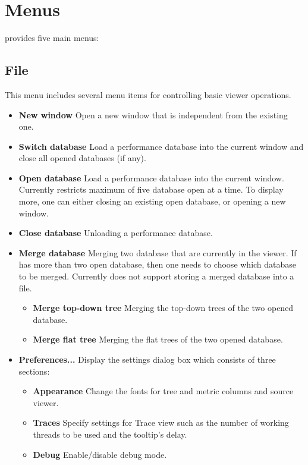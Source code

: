 \documentclass[english]{article}
\begin{document}
\section{Menus}

 provides five main menus:


\subsection{File}
This menu includes several menu items for controlling basic viewer operations.
\begin{itemize}
\item \textbf{New window}
  Open a new  window that is independent from the existing one.

\item \textbf{Switch database}
  Load a performance database into the current  window and close all opened databases (if any).

\item \textbf{Open database}
  Load a performance database into the current  window.
  Currently  restricts maximum of five database open at a time.
  To display more, one can either closing an existing open database, or opening a new  window.

\item \textbf{Close database}
  Unloading a performance database.

\item \textbf{Merge database}
  Merging two database that are currently in the viewer. If  has more than two
  open database, then one needs to choose which database to be merged.
  Currently  does not support storing a merged database into a file.

  \begin{itemize}
   \item \textbf{Merge top-down tree} Merging the top-down trees of the two opened database.
   \item \textbf{Merge flat tree} Merging the flat trees of the two opened database.
  \end{itemize}

\item \textbf{Preferences...}
  Display the settings dialog box which consists of three sections:
  \begin{itemize}
     \item \textbf{Appearance} Change the fonts for tree and metric columns and source viewer.
     \item \textbf{Traces} Specify settings for Trace view such as the number of working threads to be used and the tooltip's delay.
     \item \textbf{Debug} Enable/disable debug mode.
  \end{itemize}


\end{itemize}
\end{document}
